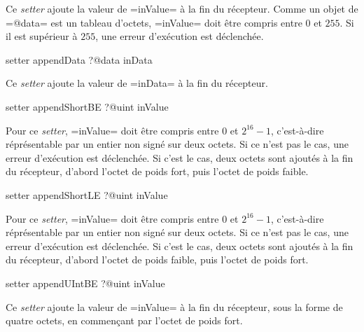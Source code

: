 Ce \emph{setter} ajoute la valeur de \ggs=inValue= à la fin du récepteur. Comme un objet de \ggs=@data= est un tableau d'octets, \ggs=inValue= doit être compris entre $0$ et $255$. Si il est supérieur à $255$, une erreur d'exécution est déclenchée.




\begin{galgas}
setter appendData ?@data inData
\end{galgas}

Ce \emph{setter} ajoute la valeur de \ggs=inData= à la fin du récepteur.






\begin{galgas}
setter appendShortBE ?@uint inValue
\end{galgas}

Pour ce \emph{setter}, \ggs=inValue= doit être compris entre $0$ et $2^{16}-1$, c'est-à-dire réprésentable par un entier non signé sur deux octets. Si ce n'est pas le cas, une erreur d'exécution est déclenchée. Si c'est le cas, deux octets sont ajoutés à la fin du récepteur, d'abord l'octet de poids fort, puis l'octet de poids faible.








\begin{galgas}
setter appendShortLE ?@uint inValue
\end{galgas}

Pour ce \emph{setter}, \ggs=inValue= doit être compris entre $0$ et $2^{16}-1$, c'est-à-dire réprésentable par un entier non signé sur deux octets. Si ce n'est pas le cas, une erreur d'exécution est déclenchée. Si c'est le cas, deux octets sont ajoutés à la fin du récepteur, d'abord l'octet de poids faible, puis l'octet de poids fort.









\begin{galgas}
setter appendUIntBE ?@uint inValue
\end{galgas}

Ce \emph{setter} ajoute la valeur de \ggs=inValue= à la fin du récepteur, sous la forme de quatre octets, en commençant par l'octet de poids fort.









